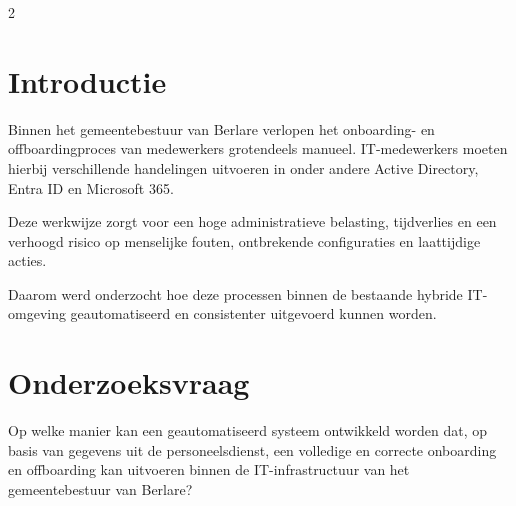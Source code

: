 \documentclass[a0,portrait]{hogent-poster}
\begin{document}
\begin{multicols}{2} %

\section{Introductie}

Binnen het gemeentebestuur van Berlare verlopen het onboarding- en offboardingproces van medewerkers grotendeels manueel. IT-medewerkers moeten hierbij verschillende handelingen uitvoeren in onder andere Active Directory, Entra ID en Microsoft 365.

Deze werkwijze zorgt voor een hoge administratieve belasting, tijdverlies en een verhoogd risico op menselijke fouten, ontbrekende configuraties en laattijdige acties.

Daarom werd onderzocht hoe deze processen binnen de bestaande hybride IT-omgeving geautomatiseerd en consistenter uitgevoerd kunnen worden.
\section{Onderzoeksvraag}

Op welke manier kan een geautomatiseerd systeem ontwikkeld worden dat, op basis van gegevens uit de personeelsdienst, een volledige en correcte onboarding en offboarding kan uitvoeren binnen de IT-infrastructuur van het gemeentebestuur van Berlare?






\end{multicols}
\end{document}
